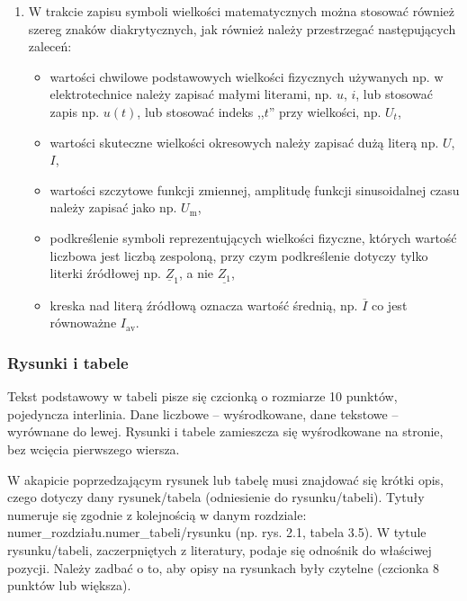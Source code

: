 \documentclass[12pt,twoside]{mwart}
\begin{document}
\begin{enumerate}[label=\arabic*), leftmargin=1.25cm]
\begin{itemize}[label=-,labelsep=0.4cm,leftmargin=0.6cm]
\end{itemize}

\item W trakcie zapisu symboli wielkości matematycznych można stosować również szereg znaków diakrytycznych, jak również należy przestrzegać następujących zaleceń:

\begin{itemize}[label=-,labelsep=0.4cm,leftmargin=0.6cm]
\item wartości chwilowe podstawowych wielkości fizycznych używanych np. w elektrotechnice należy zapisać małymi literami, np. $u$, $i$, lub stosować zapis np. $u(t)$, lub stosować indeks ,,$t$'' przy wielkości, np. $U_t$,

\item wartości skuteczne wielkości okresowych należy zapisać dużą literą np. $U$, $I$, 

\item wartości szczytowe funkcji zmiennej, amplitudę funkcji sinusoidalnej czasu należy zapisać jako np. $U_\mathrm{m}$,

\item podkreślenie symboli reprezentujących wielkości fizyczne, których wartość liczbowa jest liczbą zespoloną, przy czym podkreślenie dotyczy tylko literki źródłowej np. $\underline{Z}_1$, a nie $\underline{Z_1}$,

\item kreska nad literą źródłową oznacza wartość średnią, np. $\overline{I}$ co jest równoważne $I_\mathrm{av}$.

\end{itemize}

\end{enumerate}




\subsubsection{Rysunki i tabele} \label{Subsec:Rysunki-i-tabele}
Tekst podstawowy w tabeli pisze się czcionką o rozmiarze 10 punktów, pojedyncza interlinia. Dane liczbowe – wyśrodkowane, dane tekstowe – wyrównane do lewej. Rysunki i tabele zamieszcza się wyśrodkowane na stronie, bez wcięcia pierwszego wiersza.

W akapicie poprzedzającym rysunek lub tabelę musi znajdować się krótki opis, czego dotyczy dany rysunek/tabela (odniesienie do rysunku/tabeli). Tytuły numeruje się zgodnie z kolejnością w danym rozdziale: numer\_rozdziału.numer\_tabeli/rysunku (np. rys. 2.1, tabela 3.5). W tytule rysunku/tabeli, zaczerpniętych z literatury, podaje się odnośnik do właściwej pozycji. Należy zadbać o to, aby opisy na rysunkach były czytelne (czcionka 8 punktów lub większa).
\end{document}
